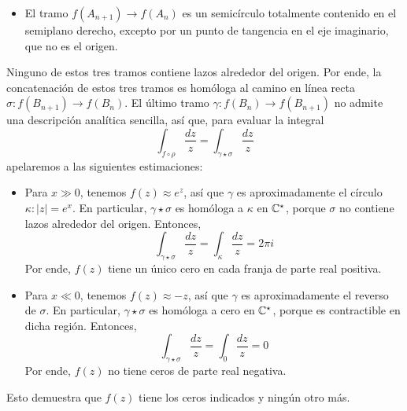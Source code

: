 \begin{solution}
\begin{itemize}
    \item El tramo $f(A_{n+1}) \to f(A_n)$ es un semicírculo totalmente contenido en el semiplano derecho, excepto por un punto de tangencia en el eje imaginario, que no es el origen.
\end{itemize}
Ninguno de estos tres tramos contiene lazos alrededor del origen. Por ende, la concatenación de estos tres tramos es homóloga al camino en línea recta $\sigma : f(B_{n+1}) \to f(B_n)$. El último tramo $\gamma : f(B_n) \to f(B_{n+1})$ no admite una descripción analítica sencilla, así que, para evaluar la integral
$$\int_{f \circ \rho} \frac {dz} z = \int_{\gamma \star \sigma} \frac {dz} z$$
apelaremos a las siguientes estimaciones:
\begin{itemize}
    \item Para $x \gg 0$, tenemos $f(z) \approx e^z$, así que $\gamma$ es aproximadamente el círculo $\kappa : |z| = e^x$. En particular, $\gamma \star \sigma$ es homóloga a $\kappa$ en $\mathbb C^\star$, porque $\sigma$ no contiene lazos alrededor del origen. Entonces,
    $$\int_{\gamma \star \sigma} \frac {dz} z = \int_{\kappa} \frac {dz} z = 2\pi i$$
    Por ende, $f(z)$ tiene un único cero en cada franja de parte real positiva.
    
    \item Para $x \ll 0$, tenemos $f(z) \approx -z$, así que $\gamma$ es aproximadamente el reverso de $\sigma$. En particular, $\gamma \star \sigma$ es homóloga a cero en $\mathbb C^\star$, porque es contractible en dicha región. Entonces,
    $$\int_{\gamma \star \sigma} \frac {dz} z = \int_0 \frac {dz} z = 0$$
    Por ende, $f(z)$ no tiene ceros de parte real negativa.
\end{itemize}
Esto demuestra que $f(z)$ tiene los ceros indicados y ningún otro más.
\end{solution}
